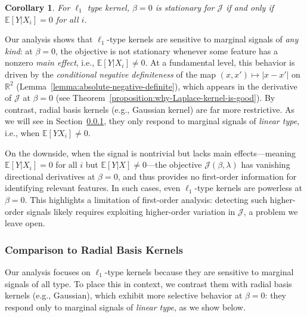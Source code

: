 \documentclass[sn-mathphys-num]{sn-jnl}%
\numberwithin{equation}{section}
\newcommand{\R}{\mathbb{R}}
\newcommand{\E}{\mathbb{E}}
\newtheorem{corollary}{Corollary}
\theoremstyle{thmstyleone}%
\theoremstyle{thmstyletwo}%
\theoremstyle{thmstylethree}%
\begin{document}
\vspace{.5em}  
\begin{corollary}
\label{corollary:beta=zero-not-stationary-ell-one}
For $\ell_1$ type kernel, $\beta = 0$ is stationary for $\mathcal{J}$ if and only if $\E[Y|X_i] =0$ for all $i$. 
\end{corollary} 

\vspace{.5em}  

Our analysis shows that $\ell_1$-type kernels are sensitive to marginal signals of \emph{any kind}: at $\beta = 0$, the objective is not stationary whenever some feature has a nonzero \emph{main effect}, i.e., $\E[Y|X_i] \ne 0$. At a fundamental level, this behavior is driven by the \emph{conditional negative definiteness} of the map $(x, x') \mapsto |x-x'|$ on $\R^2$ (Lemma~\ref{lemma:absolute-negative-definite}), which appears in the derivative of $\mathcal{J}$ at $\beta = 0$ (see Theorem~\ref{proposition:why-Laplace-kernel-is-good}). By contrast, radial basis kernels (e.g., Gaussian kernel) are far more restrictive. As we will see in Section~\ref{sec:comparison-to-radial-basis-kernels}, they only respond to marginal signals of \emph{linear type}, i.e., when $\E[Y X_i] \ne 0$. %

On the downside, when the signal is nontrivial but lacks main effects---meaning $\E[Y|X_i] = 0$ for all $i$ but $\E[Y|X] \ne 0$---the objective $\mathcal{J}(\beta, \lambda)$ has vanishing directional derivatives at $\beta = 0$, and thus provides no first-order information for identifying relevant features. In such cases, even $\ell_1$-type kernels are powerless at $\beta = 0$. This highlights a  limitation of first-order analysis: detecting such higher-order signals likely requires exploiting higher-order variation in $\mathcal{J}$, a problem we leave open.


\subsubsection{Comparison to Radial Basis Kernels} 
\label{sec:comparison-to-radial-basis-kernels}
Our analysis focuses on $\ell_1$-type kernels because they are sensitive to marginal signals of all type. To place this in context, we contrast them with radial basis kernels (e.g., Gaussian), which exhibit more selective behavior at $\beta = 0$: they respond only to marginal signals of \emph{linear type}, as we show below. 
\end{document}
